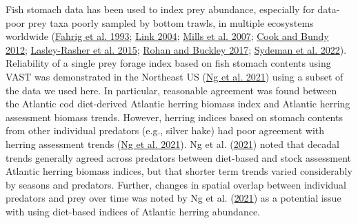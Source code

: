\documentclass[
]{article}
\begin{document}
Fish stomach data has been used to index prey abundance, especially for data-poor prey taxa poorly sampled by bottom trawls, in multiple ecosystems worldwide (\protect\hyperlink{ref-fahrig_predator_1993}{Fahrig et al. 1993}; \protect\hyperlink{ref-link_using_2004}{Link 2004}; \protect\hyperlink{ref-mills_diets_2007}{Mills et al. 2007}; \protect\hyperlink{ref-cook_use_2012}{Cook and Bundy 2012}; \protect\hyperlink{ref-lasley-rasher_it_2015}{Lasley-Rasher et al. 2015}; \protect\hyperlink{ref-rohan_spatial_2017}{Rohan and Buckley 2017}; \protect\hyperlink{ref-sydeman_integrating_2022}{Sydeman et al. 2022}). Reliability of a single prey forage index based on fish stomach contents using VAST was demonstrated in the Northeast US (\protect\hyperlink{ref-ng_predator_2021}{Ng et al. 2021}) using a subset of the data we used here. In particular, reasonable agreement was found between the Atlantic cod diet-derived Atlantic herring biomass index and Atlantic herring assessment biomass trends. However, herring indices based on stomach contents from other individual predators (e.g., silver hake) had poor agreement with herring assessment trends (\protect\hyperlink{ref-ng_predator_2021}{Ng et al. 2021}). Ng et al. (\protect\hyperlink{ref-ng_predator_2021}{2021}) noted that decadal trends generally agreed across predators between diet-based and stock assessment Atlantic herring biomass indices, but that shorter term trends varied considerably by seasons and predators. Further, changes in spatial overlap between individual predators and prey over time was noted by Ng et al. (\protect\hyperlink{ref-ng_predator_2021}{2021}) as a potential issue with using diet-based indices of Atlantic herring abundance.
\end{document}
